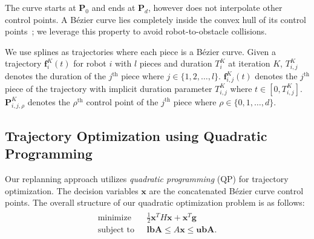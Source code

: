 \documentclass{svproc}
\newcommand{\vP}{\mathbf{P}}
\newcommand{\vg}{\mathbf{g}}
\newcommand{\vf}{\mathbf{f}}
\newcommand{\vw}{\mathbf{w}}
\newcommand{\vx}{\mathbf{x}}
\newcommand{\vlbA}{\mathbf{lbA}}
\newcommand{\vubA}{\mathbf{ubA}}
\newcommand{\vlb}{\mathbf{lb}}
\newcommand{\vub}{\mathbf{ub}}
\newcommand{\R}{\mathbb{R}} %
\renewcommand{\th}{^{\text{th}}}
\begin{document}
The curve starts at $\vP_0$ and ends at $\vP_d$, however does not interpolate other control points.
A B\'ezier curve lies completely inside the convex hull of its control points~\cite{Bernstein};
we leverage this property to avoid robot-to-obstacle collisions.

We use splines as trajectories where each piece is a B\'ezier curve. Given a trajectory $\vf^{K}_i(t)$ for robot $i$ with $l$ pieces and duration $T^{K}_i$ at iteration $K$, $T^{K}_{i,j}$ denotes the duration of the $j\th$ piece where $j \in \{1,2,\ldots,l\}$. $\vf^{K}_{i,j}(t)$ denotes the $j\th$ piece of the trajectory with implicit duration parameter $T^K_{i,j}$ where $t\in[0, T^{K}_{i,j}]$. $\vP^{K}_{i,j,\rho}$ denotes the $\rho\th$ control point of the $j\th$ piece where $\rho \in \{0,1,\ldots,d\}$.



\subsection{Trajectory Optimization using Quadratic Programming} \label{trajectoryOptimization}
Our replanning approach utilizes \emph{quadratic programming} (QP) for trajectory optimization.
The decision variables $\vx$ are the concatenated B\'ezier curve control points.
The overall structure of our quadratic optimization problem is as follows:
\begin{align}
\begin{split}
    \text{minimize}\ \ \ &\frac{1}{2}\vx^TH\vx + \vx^T\vg\\
    \text{subject to}\ \ \ & \vlbA \leq A\vx \leq \vubA.
\end{split}
\end{align}
\end{document}
